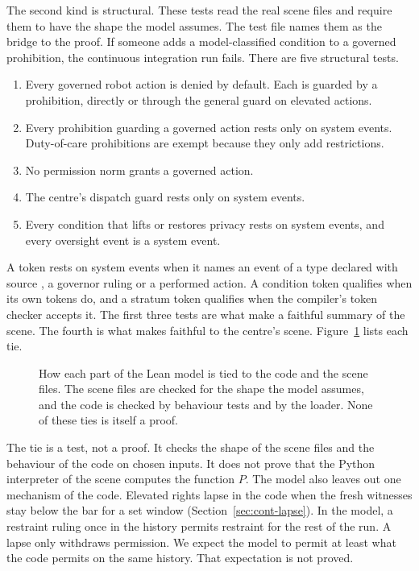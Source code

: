 The second kind is structural.
These tests read the real scene files and require them to have the shape the model assumes.
The test file names them as the bridge to the proof.
If someone adds a model-classified condition to a governed prohibition, the continuous
integration run fails.
There are five structural tests.
\begin{enumerate}
  \item Every governed robot action is denied by default.
  Each is guarded by a prohibition, directly or through the general guard on elevated actions.
  \item Every prohibition guarding a governed action rests only on system events.
  Duty-of-care prohibitions are exempt because they only add restrictions.
  \item No permission norm grants a governed action.
  \item The centre's dispatch guard rests only on system events.
  \item Every condition that lifts or restores privacy rests on system events, and every
  oversight event is a system event.
\end{enumerate}
A token rests on system events when it names an event of a type declared with source
, a governor ruling or a performed action.
A condition token qualifies when its own tokens do, and a stratum token qualifies when the
compiler's token checker accepts it.
The first three tests are what make  a faithful summary of the scene.
The fourth is what makes  faithful to the centre's scene.
Figure~\ref{fig:lean-bridge} lists each tie.

\begin{figure}[t]
  \centering
  
  \caption{How each part of the Lean model is tied to the code and the scene files. The scene
  files are checked for the shape the model assumes, and the code is checked by behaviour tests
  and by the loader. None of these ties is itself a proof.}
  \label{fig:lean-bridge}
\end{figure}

The tie is a test, not a proof.
It checks the shape of the scene files and the behaviour of the code on chosen inputs.
It does not prove that the Python interpreter of the scene computes the function $P$.
The model also leaves out one mechanism of the code.
Elevated rights lapse in the code when the fresh witnesses stay below the bar for a set window
(Section~\ref{sec:cont-lapse}).
In the model, a restraint ruling once in the history permits restraint for the rest of the run.
A lapse only withdraws permission.
We expect the model to permit at least what the code permits on the same history.
That expectation is not proved.

